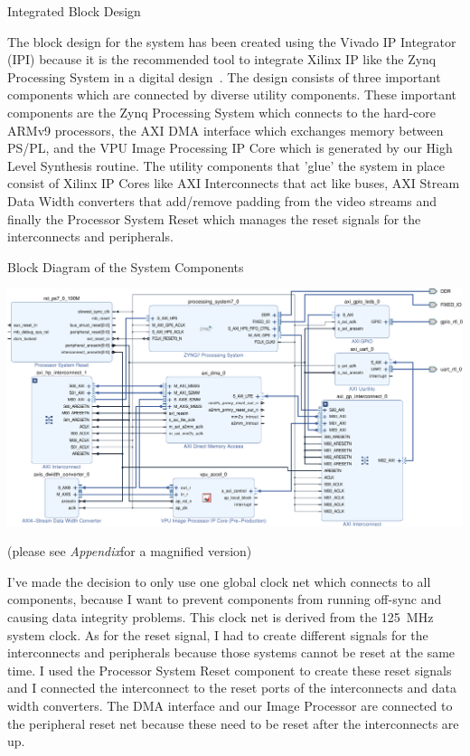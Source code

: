 \documentclass{matthijs}
\begin{document}
	\begin{hoofdstuk}{Integrated Block Design}

		The block design for the system has been created using the Vivado IP Integrator (IPI) because it is the recommended tool to integrate Xilinx IP like the Zynq Processing System in a digital design~\cite{xilinxug994}.
		The design consists of three important components which are connected by diverse utility components.
		These important components are the Zynq Processing System which connects to the hard-core ARMv9 processors, the AXI DMA interface which exchanges memory between PS/PL, and the VPU Image Processing IP Core which is generated by our High Level Synthesis routine.
		The utility components that 'glue' the system in place consist of Xilinx IP Cores like AXI Interconnects that act like buses, AXI Stream Data Width converters that add/remove padding from the video streams and finally the Processor System Reset which manages the reset signals for the interconnects and peripherals.

		\begin{figuur}{Block Diagram of the System Components}
			
			\centerline{\includegraphics[width=1.2\textwidth]{hw-block-diagram-v2-crop-asset.pdf}}
			
			\vspace{0.5cm}
			
			(please see \textit{Appendix}for a magnified version)

		\end{figuur}
		\vspace{-0.35ex} %

		I've made the decision to only use one global clock net which connects to all components, because I want to prevent components from running off-sync and causing data integrity problems.
		This clock net is derived from the \qty{125}{\mega\hertz} system clock.
		As for the reset signal, I had to create different signals for the interconnects and peripherals because those systems cannot be reset at the same time.
		I used the Processor System Reset component to create these reset signals and I connected the interconnect to the reset ports of the interconnects and data width converters.
		The DMA interface and our Image Processor are connected to the peripheral reset net because these need to be reset after the interconnects are up.


\end{hoofdstuk}
\end{document}

